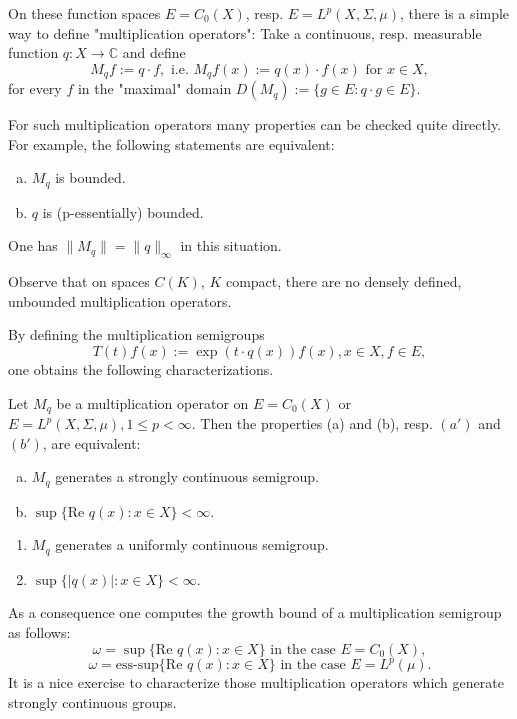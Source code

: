 On these function spaces $E=C_0(X)$, resp. $E=L^p(X,\Sigma,\mu)$, there is a simple way to define "multiplication operators": Take a continuous, resp. measurable function $q: X \rightarrow \mathbb{C}$ and define
\[
M_{q}f := q \cdot f, \text{ i.e. } M_{q}f(x) := q(x) \cdot f(x) \text{ for } x \in X,
\]
for every $f$ in the "maximal" domain $D(M_{q}) := \{g \in E: q \cdot g \in E\}$.

For such multiplication operators many properties can be checked quite directly.
For example, the following statements are equivalent:

\begin{enumerate}[(a)]
\item
$M_{q}$ is bounded.

\item
$q$ is (p-essentially) bounded.

\end{enumerate}
One has $\|M_{q}\| = \|q\|_\infty$ in this situation.

Observe that on spaces $C(K)$, $K$ compact, there are no densely defined, unbounded multiplication operators.

By defining the multiplication semigroups
\[
T(t)f(x) := \exp(t \cdot q(x))f(x), x \in X, f \in E,
\]
one obtains the following characterizations.

\begin{proposition} 
Let $M_{q}$ be a multiplication operator on $E=C_0(X)$ or $E=L^p(X,\Sigma,\mu), 1 \leq p < \infty$.
Then the properties (a) and (b), resp. $(a')$ and $(b')$, are equivalent:
\begin{enumerate}[(a)]
\item
$M_{q}$ generates a strongly continuous semigroup.
\item
$\sup\{\text{Re }q(x): x \in X\} < \infty$.
\end{enumerate}

\begin{enumerate}[($a'$)]
\item
$M_{q}$ generates a uniformly continuous semigroup.
\item
$\sup\{|q(x)|: x \in X\} < \infty$.
\end{enumerate}
\end{proposition} 
As a consequence one computes the growth bound of a multiplication semigroup as follows:
\[
\omega = \sup\{\text{Re }q(x): x \in X\} \text{ in the case } E = C_0(X),
\]
\[
\omega = \text{ess-sup}\{\text{Re }q(x): x \in X\} \text{ in the case } E = L^p(\mu).
\]
It is a nice exercise to characterize those multiplication operators which generate strongly continuous groups.


